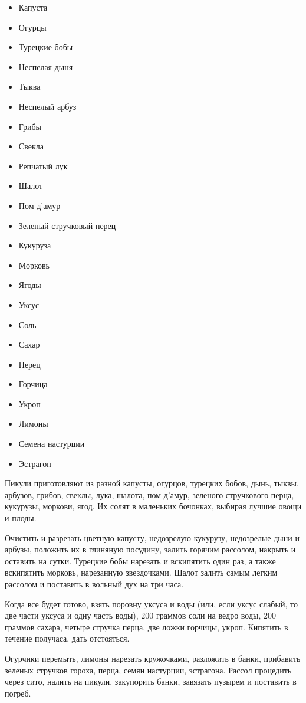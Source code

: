\begin{itemize}
	\item Капуста
    \item Огурцы
    \item Турецкие бобы
    \item Неспелая дыня
    \item Тыква
    \item Неспелый арбуз
    \item Грибы
    \item Свекла
    \item Репчатый лук
    \item Шалот
    \item Пом д’амур 
    \item Зеленый стручковый перец 
    \item Кукуруза
    \item Морковь 
    \item Ягоды
    \item Уксус 
    \item Соль
    \item Сахар 
    \item Перец 
    \item Горчица 
    \item Укроп 
    \item Лимоны
    \item Семена настурции 
    \item Эстрагон
\end{itemize}

Пикули приготовляют из разной капусты, огурцов, турецких бобов, дынь, тыквы, арбузов, грибов, свеклы, лука, шалота, пом д’амур, зеленого стручкового перца, кукурузы, моркови, ягод. Их солят в маленьких бочонках, выбирая лучшие овощи и плоды.

Очистить и разрезать цветную капусту, недозрелую кукурузу, недозрелые дыни и арбузы, положить их в глиняную посудину, залить горячим рассолом, накрыть и оставить на сутки. Турецкие бобы нарезать и вскипятить один раз, а также вскипятить морковь, нарезанную звездочками. Шалот залить самым легким рассолом и поставить в вольный дух на три часа.

Когда все будет готово, взять поровну уксуса и воды (или, если уксус слабый, то две части уксуса и одну часть воды), 200 граммов соли на ведро воды, 200 граммов сахара, четыре стручка перца, две ложки горчицы, укроп. Кипятить в течение получаса, дать отстояться.

Огурчики перемыть, лимоны нарезать кружочками, разложить в банки, прибавить зеленых стручков гороха, перца, семян настурции, эстрагона. Рассол процедить через сито, налить на пикули, закупорить банки, завязать пузырем и поставить в погреб.

